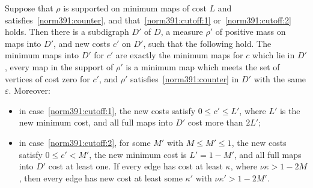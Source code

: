 \begin{lemma}
\label{norm391:cutoff}\label{norm391:cutoff:rest}
Suppose that $\rho$ is supported on minimum maps of cost $L$ and satisfies~\eqref{norm391:counter}, and that~\ref{norm391:cutoff:1} or~\ref{norm391:cutoff:2} holds. Then there is a subdigraph $D'$ of $D$, a measure $\rho'$ of positive mass on maps into $D'$, and new costs $c'$ on $D'$, such that the following hold.
The minimum maps into $D'$ for $c'$ are exactly the minimum maps for $c$ which lie in $D'$, every map in the support of $\rho'$ is a minimum map which meets the set of vertices of cost zero for $c'$, and $\rho'$ satisfies~\eqref{norm391:counter} in $D'$ with the same $\varepsilon$. Moreover:
\begin{itemize}
\item in case~\ref{norm391:cutoff:1}, the new costs satisfy $0\le c'\le L'$, where $L'$ is the new minimum cost, and all full maps into $D'$ cost more than $2L'$;
\item in case~\ref{norm391:cutoff:2}, for some $M'$ with $M\le M'\le 1$, the new costs satisfy $0\le c'<M'$, the new minimum cost is $L'=1-M'$, and all full maps into $D'$ cost at least one. If every edge has cost at least $\kappa$, where $\nu\kappa>1-2M$, then every edge has new cost at least some $\kappa'$ with $\nu\kappa'>1-2M'$.
\end{itemize}
\end{lemma}

